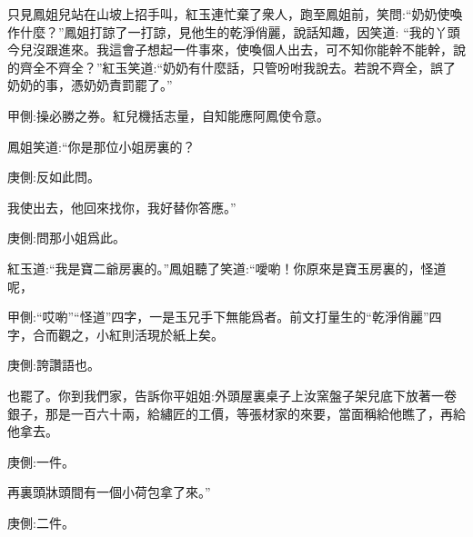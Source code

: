 \begin{parag}
    只見鳳姐兒站在山坡上招手叫，紅玉連忙棄了衆人，跑至鳳姐前，笑問:“奶奶使喚作什麼？”鳳姐打諒了一打諒，見他生的乾淨俏麗，說話知趣，因笑道: “我的丫頭今兒沒跟進來。我這會子想起一件事來，使喚個人出去，可不知你能幹不能幹，說的齊全不齊全？”紅玉笑道:“奶奶有什麼話，只管吩咐我說去。若說不齊全，誤了奶奶的事，憑奶奶責罰罷了。”\begin{note}甲側:操必勝之券。紅兒機括志量，自知能應阿鳳使令意。\end{note}鳳姐笑道:“你是那位小姐房裏的？\begin{note}庚側:反如此問。\end{note}我使出去，他回來找你，我好替你答應。”\begin{note}庚側:問那小姐爲此。\end{note}紅玉道:“我是寶二爺房裏的。”鳳姐聽了笑道:“噯喲！你原來是寶玉房裏的，怪道呢，\begin{note}甲側:“哎喲”“怪道”四字，一是玉兄手下無能爲者。前文打量生的“乾淨俏麗”四字，合而觀之，小紅則活現於紙上矣。\end{note}\begin{note}庚側:誇讚語也。\end{note}也罷了。你到我們家，告訴你平姐姐:外頭屋裏桌子上汝窯盤子架兒底下放著一卷銀子，那是一百六十兩，給繡匠的工價，等張材家的來要，當面稱給他瞧了，再給他拿去。\begin{note}庚側:一件。\end{note}再裏頭牀頭間有一個小荷包拿了來。”\begin{note}庚側:二件。\end{note}
\end{parag}


